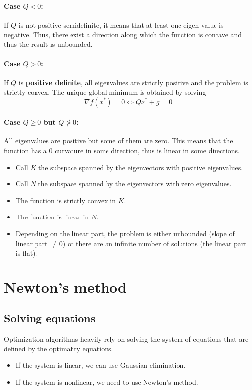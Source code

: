 \paragraph{Case $Q < 0$:}
If $Q$ is not positive semidefinite, it means that at least one eigen value is negative. Thus, there exist a direction along which the function is concave and thus the result is unbounded.

\paragraph{Case $Q > 0$:}
If $Q$ is \textbf{positive definite}, all eigenvalues are strictly positive and the problem is strictly convex. The unique global minimum is obtained by solving
\begin{equation}
    \nabla f(x^*) = 0 \iff Qx^* + g = 0
\end{equation}

\paragraph{Case $Q \geq 0$ but $Q \not> 0$:} All eigenvalues are positive but some of them are zero. This means that the function has a 0 curvature in some direction, thus is linear in some directions.
\begin{itemize}
    \item Call $K$ the subspace spanned by the eigenvectors with positive eigenvalues.
    \item Call $N$ the subspace spanned by the eigenvectors with zero eigenvalues.
    \item The function is strictly convex in $K$.
    \item The function is linear in $N$.
    \item Depending on the linear part, the problem is either unbounded (slope of linear part $\neq 0$) or there are an infinite number of solutions (the linear part is flat).
\end{itemize}

\section{Newton's method}
\subsection{Solving equations}
Optimization algorithms heavily rely on solving the system of equations that are defined by the optimality equations.
\begin{itemize}
    \item If the system is linear, we can use Gaussian elimination.
    \item If the system is nonlinear, we need to use Newton's method.
\end{itemize}

